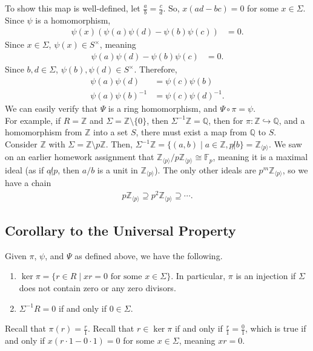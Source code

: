 \documentclass[8pt]{extarticle}
\newcommand{\Q}{\mathbb{Q}}
\newcommand{\Z}{\mathbb{Z}}
\begin{document}
  To show this map is well-defined, let $\frac{a}{b} = \frac{c}{d}$. So, $x(ad-bc) = 0$ for some $x\in\Sigma$. Since $\psi$ is a homomorphism,
  \begin{align*}
    \psi(x)(\psi(a)\psi(d) - \psi(b)\psi(c)) &= 0.
  \end{align*}
  Since $x\in \Sigma$, $\psi(x)\in S^{\times}$, meaning
  \begin{align*}
    \psi(a)\psi(d) - \psi(b)\psi(c) &= 0.
  \end{align*}
  Since $b,d\in\Sigma$, $\psi(b),\psi(d)\in S^{\times}$. Therefore,
  \begin{align*}
    \psi(a)\psi(d) &= \psi(c)\psi(b)\\
    \psi(a)\psi(b)^{-1} &= \psi(c)\psi(d)^{-1}.
  \end{align*}
  We can easily verify that $\Psi$ is a ring homomorphism, and $\Psi\circ \pi = \psi$.\\

  For example, if $R = \Z$ and $\Sigma = \Z\setminus\{0\}$, then $\Sigma^{-1}\Z = \Q$, then for $\pi: \Z\hookrightarrow \Q$, and a homomorphism from $\Z$ into a set $S$, there must exist a map from $\Q$ to $S$.\\

  Consider $\Z$ with $\Sigma = \Z\setminus p\Z$. Then, $\Sigma^{-1}\Z = \{(a,b)\mid a\in\Z, p\not|b\} = \Z_{\langle p \rangle}$. We saw on an earlier homework assignment that $\Z_{\langle p \rangle}/p\Z_{\langle p \rangle} \cong \mathbb{F}_p$, meaning it is a maximal ideal (as if $a\not| p$, then $a/b$ is a unit in $\Z_{\langle p \rangle}$). The only other ideals are $p^m \Z_{\langle p \rangle}$, so we have a chain
  \begin{align*}
    p\Z_{\langle p \rangle} \supseteq p^2\Z_{\langle p \rangle} \supseteq \cdots.
  \end{align*}
  \subsection{Corollary to the Universal Property}%
  Given $\pi$, $\psi$, and $\Psi$ as defined above, we have the following.
  \begin{enumerate}[(1)]
    \item $\ker \pi = \{r\in R\mid xr = 0\text{ for some }x\in \Sigma\}$. In particular, $\pi$ is an injection if $\Sigma$ does not contain zero or any zero divisors.
    \item $\Sigma^{-1}R = 0$ if and only if $0\in \Sigma$.
  \end{enumerate}
  Recall that $\pi(r) = \frac{r}{1}$. Recall that $r\in \ker\pi$ if and only if $\frac{r}{1} = \frac{0}{1}$, which is true if and only if $x(r\cdot 1 - 0\cdot 1) = 0$ for some $x\in \Sigma$, meaning $xr = 0$.\\
\end{document}
